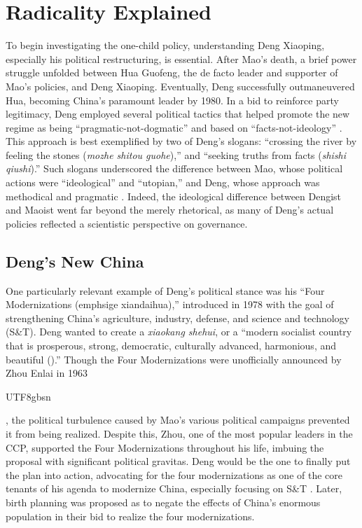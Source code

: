 \section{Radicality Explained}

To begin investigating the one-child policy, understanding Deng Xiaoping, especially his political restructuring, is essential. After Mao’s death, a brief power struggle unfolded between Hua Guofeng, the de facto leader and supporter of Mao’s policies, and Deng Xiaoping. Eventually, Deng successfully outmaneuvered Hua, becoming China’s paramount leader by 1980. In a bid to reinforce party legitimacy, Deng employed several political tactics that helped promote the new regime as being “pragmatic-not-dogmatic” and based on “facts-not-ideology” \autocite[p.\ 97]{Greenhalgh2008JustOneChild}. This approach is best exemplified by two of Deng’s slogans: “crossing the river by feeling the stones (\emph{mozhe shitou guohe}),” and “seeking truths from facts (\emph{shishi qiushi}).” Such slogans underscored the difference between Mao, whose political actions were “ideological” and “utopian,” and Deng, whose approach was methodical and pragmatic \autocite[p.\ 97]{Greenhalgh2008JustOneChild}. Indeed, the ideological difference between Dengist and Maoist went far beyond the merely rhetorical, as many of Deng’s actual policies reflected a scientistic perspective on governance.

\subsection{Deng's New China}

One particularly relevant example of Deng’s political stance was his “Four Modernizations (emph{sige xiandaihua}),” introduced in 1978 with the goal of strengthening China’s agriculture, industry, defense, and science and technology (S\&T). Deng wanted to create a \emph{xiaokang shehui}, or a “modern socialist country that is prosperous, strong, democratic, culturally advanced, harmonious, and beautiful (\cites{LiNan2018ThirdPlenumCommunique}{Xinhua2020Xiaokang}).” Though the Four Modernizations were unofficially announced by Zhou Enlai in 1963 \begin{CJK}{UTF8}{gbsn}\autocite{RenminArchive2016ScienceTechMeeting}\end{CJK}, the political turbulence caused by Mao’s various political campaigns prevented it from being realized. Despite this, Zhou, one of the most popular leaders in the CCP, supported the Four Modernizations throughout his life, imbuing the proposal with significant political gravitas. Deng would be the one to finally put the plan into action, advocating for the four modernizations as one of the core tenants of his agenda to modernize China, especially focusing on S\&T \autocite[p.\ 94]{Greenhalgh2008JustOneChild}. Later, birth planning was proposed as to negate the effects of China’s enormous population in their bid to realize the four modernizations.

